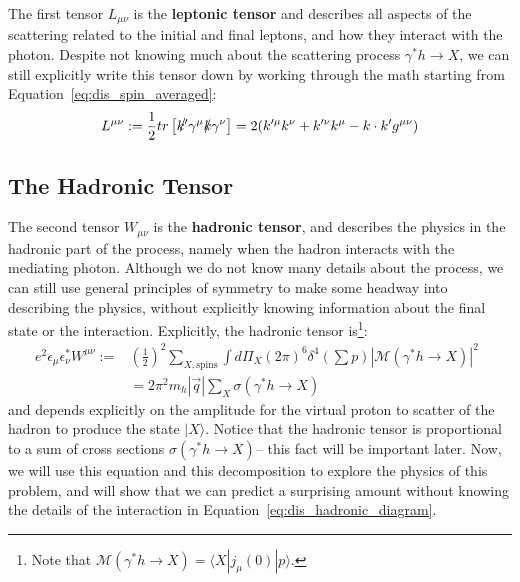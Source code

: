 \documentclass[11pt, oneside]{article}   	%
\theoremstyle{definition}
\begin{document}
The first tensor $L_{\mu\nu}$ is the \textbf{leptonic tensor} and describes all aspects of the scattering related to the  
initial and final leptons, and how they interact with the photon. Despite not knowing much about the scattering process 
$\gamma^* h\rightarrow X$, we can still explicitly write this tensor down by working through the math starting from 
Equation~\ref{eq:dis_spin_averaged}:
\begin{equation}
	L^{\mu\nu} := \frac{1}{2}tr\left[\slashed{k'}\gamma^\mu\slashed{k}\gamma^\nu\right] = 2(k'^\mu k^\nu + k'^\nu k^\mu - k\cdot k' g^{\mu\nu})
\end{equation}

\subsection{The Hadronic Tensor}

The second tensor $W_{\mu\nu}$ is the \textbf{hadronic tensor}, and describes the physics in the hadronic part of the process, 
namely when the hadron interacts with the mediating photon. Although we do not know many details about the process, we 
can still use general principles of symmetry to make some headway into describing the physics, without explicitly knowing 
information about the final state or the interaction. Explicitly, the hadronic tensor is\footnote{Note that $\mathcal{M}(\gamma^* h\rightarrow X) = \langle X | j_\mu (0) | p\rangle$.}:
\begin{align}
	e^2\epsilon_\mu\epsilon_\nu^* W^{\mu\nu} :=& \left(\frac{1}{2}\right)^2
	\sum_{X, \mathrm{spins}} \int d\Pi_X (2\pi)^6\delta^4\left(\sum p\right)
	|\mathcal M(\gamma^*h\rightarrow X)|^2~
	\label{eq:hadronic_tensor}~
	\\
	& = 2\pi^2 m_{h}|\vec q|\sum_X \sigma(\gamma^*h\rightarrow X)~
	\label{eq:hadronic_tensor_cross}
\end{align}
and depends explicitly on the amplitude for the virtual proton to scatter of the hadron to produce the state $|X\rangle$. 
Notice that the hadronic tensor is proportional to a sum of cross 
sections $\sigma(\gamma^* h\rightarrow X)$-- this fact will be important later. Now, we will use this equation and this 
decomposition to explore the physics of this problem, and will show that we can predict a surprising amount without knowing 
the details of the interaction in Equation~\ref{eq:dis_hadronic_diagram}.
\end{document}
